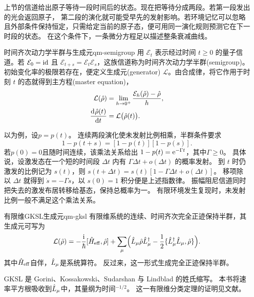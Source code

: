 上节的信道给出原子等待一段时间后的状态。现在把等待分成两段。若第一段发出的光会返回原子，
第二段的演化就可能受早先的发射影响。若环境记忆可以忽略且外部条件保持恒定，只需给定当前的原子态，便可用同一演化规则预测它在下一时段的状态。
在这个条件下，一条微分方程足以描述整条衰减曲线。

\begin{definition}{时间齐次动力学半群与生成元}{qm-semigroup}
    用 $\mathcal E_t$ 表示经过时间 $t \geq 0$ 的量子信道。若
    $\mathcal E_0 = \operatorname{id}$ 且 $\mathcal E_{t+s} = \mathcal E_t\mathcal E_s$，这族信道称为时间齐次动力学半群(semigroup)。
    初始变化率的极限若存在，便定义生成元(generator) $\mathcal L$。由合成律，将它作用于时刻 $t$ 的态就得到主方程(master equation)，
    \begin{subequations}
        \begin{align}
            \mathcal L(\hat{\rho}) &= \lim_{h\to0^+}\frac{\mathcal E_h(\hat{\rho}) - \hat{\rho}}{h},\\
            \frac{\mathop{}\!\mathrm{d}^{}\hat{\rho}(t)}{\mathrm{d}{t}^{}} &= \mathcal L\bigl(\hat{\rho}(t)\bigr).
        \end{align}
    \end{subequations}
\end{definition}

以为例，设$p = p(t)$。
连续两段演化使未发射比例相乘，半群条件要求
\begin{equation}
    1 - p(t + s) = [1 - p(t)][1 - p(s)].
\end{equation}
若$p(0) = 0$且随时间连续，该乘法关系给出
$1 - p(t) = \mathop{}\!\mathrm{e}^{-\Gamma t}$，其中$\Gamma \geq 0$。
具体说，设激发态在一个短的时间段 $\Delta t$ 内有 $\Gamma\Delta t + o(\Delta t)$ 的概率发射。
到 $t$ 时仍激发的比例记为 $s(t)$，则 $s(t + \Delta t) = s(t)[1 - \Gamma\Delta t + o(\Delta t)]$。
移项除以 $\Delta t$ 就得到 $\dot s = -\Gamma s$，以 $s(0) = 1$ 积分便是上述指数律。
振幅阻尼信道同时把失去的激发布居转移给基态，保持总概率为一。
有限环境发生复现时，未发射比例一般不满足这个乘法关系。

\begin{theorem}{有限维GKSL生成元}{qm-gksl}
    有限维系统的连续、时间齐次完全正迹保持半群，其生成元可写为
    \begin{equation}
        \mathcal L(\hat{\rho}) = -\frac{\mathrm{i}}\hbar[\hat{H}_{\mathrm{eff}},\hat{\rho}]
        + \sum_\mu\Bigl(\hat{L}_\mu\hat{\rho} \hat{L}_\mu^\dagger
            - \frac12\{\hat{L}_\mu^\dagger \hat{L}_\mu,\hat{\rho}\}\Bigr).
        \label{eq:lindblad}
    \end{equation}
    其中$\hat{H}_{\mathrm{eff}}$自伴，$\hat{L}_\mu$是系统算符。
    反过来，这一形式生成完全正迹保持半群。
\end{theorem}
GKSL 是 Gorini、Kossakowski、Sudarshan 与 Lindblad 的姓氏缩写。
本书将速率平方根吸收到$\hat{L}_\mu$中，其量纲为时间$^{-1/2}$。
这一有限维分类定理的证明见文献\cite{manzano}。

